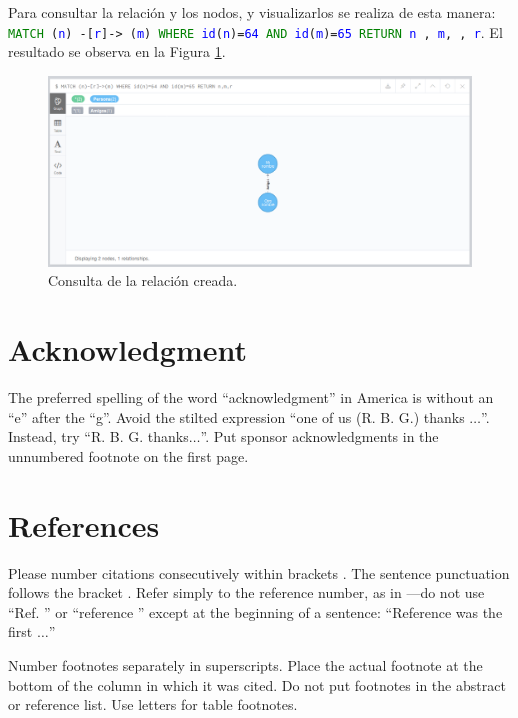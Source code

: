 \documentclass[conference]{IEEEtran}
\begin{document}
Para consultar la relación y los nodos, y visualizarlos se realiza de esta manera: \texttt{\textcolor{green}{MATCH} (\textcolor{blue}{n}) -[\textcolor{blue}{r}]-> (\textcolor{blue}{m}) \textcolor{green}{WHERE} \textcolor{blue}{id}(\textcolor{blue}{n})=\textcolor{blue}{64} \textcolor{green}{AND} \textcolor{blue}{id}(\textcolor{blue}{m})=\textcolor{blue}{65}  \textcolor{green}{RETURN} \textcolor{blue}{n} , \textcolor{blue}{m}, , \textcolor{blue}{r}}. El resultado se observa en la Figura \ref{fig35}.

\begin{figure}[H]
\begin{center}
\includegraphics[width= 0.45 \textwidth]{relation_query1.png}
\end{center}
\caption{Consulta de la relación creada.}
\label{fig35}
\end{figure}



\section*{Acknowledgment}

The preferred spelling of the word ``acknowledgment'' in America is without 
an ``e'' after the ``g''. Avoid the stilted expression ``one of us (R. B. 
G.) thanks $\ldots$''. Instead, try ``R. B. G. thanks$\ldots$''. Put sponsor 
acknowledgments in the unnumbered footnote on the first page.

\section*{References}

Please number citations consecutively within brackets \cite{b1}. The 
sentence punctuation follows the bracket \cite{b2}. Refer simply to the reference 
number, as in \cite{b3}---do not use ``Ref. \cite{b3}'' or ``reference \cite{b3}'' except at 
the beginning of a sentence: ``Reference \cite{b3} was the first $\ldots$''

Number footnotes separately in superscripts. Place the actual footnote at 
the bottom of the column in which it was cited. Do not put footnotes in the 
abstract or reference list. Use letters for table footnotes.
\end{document}
